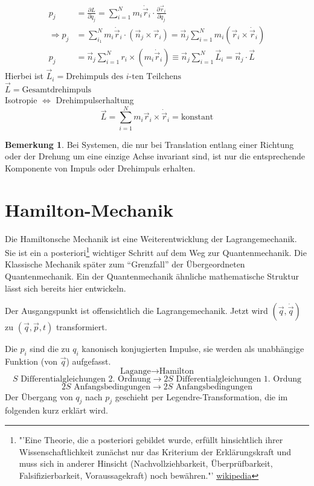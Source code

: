 \documentclass[oneside]{book}
\theoremstyle{definition}
\newtheorem*{bemerkung*}{Bemerkung}
\newcommand{\dotvec}[1]{\dot{\vec{#1}}}
\newcommand{\const}{\text{konstant}}
\begin{document}
\begin{align*}
	p_j &= \frac{\partial L}{\partial \dot q_j} = \sum\limits_{i=1}^Nm_i \dot {\vec r}_i \cdot \frac{\partial \vec r_i}{\partial q_j}\\
	\Rightarrow p_j &= \sum\limits_{i_1}^N m_i \dot {\vec r}_i \cdot (\vec n_j \times \vec r_i) = \vec n_j \sum\limits_{i=1}^N m_i (\vec r_i \times \dot {\vec r}_i)\\
	p_j &= \vec n_j \sum\limits_{i=1}^N r_i \times (m_i\dot{\vec r}_i) \equiv \vec n_j \sum\limits_{i=1}^N \vec L_i = \vec n_j \cdot \vec L
\end{align*}
Hierbei ist
$\vec L_i = \text{Drehimpuls des $i$-ten Teilchens}$\\
$\vec L = \text{Gesamtdrehimpuls}$\\
Isotropie  $\Leftrightarrow$ Drehimpulserhaltung
\[\vec L = \sum\limits_{i=1}^Nm_i \vec r_i \times \dotvec r_i = \const \]
\begin{bemerkung*}
	Bei Systemen, die nur bei Translation entlang einer Richtung oder der Drehung um eine einzige Achse invariant sind, ist nur die entsprechende Komponente von Impuls oder Drehimpuls erhalten.
\end{bemerkung*}

\section{Hamilton-Mechanik}
Die Hamiltonsche Mechanik ist eine Weiterentwicklung der Lagrangemechanik. Sie ist ein a posteriori\footnote{"'Eine Theorie, die a posteriori gebildet wurde, erfüllt hinsichtlich ihrer Wissenschaftlichkeit zunächst nur das Kriterium der Erklärungskraft und muss sich in anderer Hinsicht (Nachvollziehbarkeit, Überprüfbarkeit, Falsifizierbarkeit, Voraussagekraft) noch bewähren."' \href{https://de.wikipedia.org/wiki/A_posteriori}{wikipedia}} wichtiger Schritt auf dem Weg zur Quantenmechanik. Die Klassische Mechanik später zum "`Grenzfall"' der Übergeordneten Quantenmechanik. Ein der Quantenmechanik ähnliche mathematische Struktur lässt sich bereits hier entwickeln.

Der Ausgangspunkt ist offensichtlich die Lagrangemechanik. Jetzt wird $(\vec q, \dot {\vec q})$ zu $(\vec q, \vec p, t)$ transformiert.

Die $p_i$ sind die zu $q_i$ kanonisch konjugierten Impulse, sie werden als unabhängige Funktion (von $\vec q$) aufgefasst.
\[\text{Lagange}\to\text{Hamilton}\]
\[\text{$S$ Differentialgleichungen 2. Ordnung}\to\text{$2S$ Differentialgleichungen 1. Ordung}\]
\[\text{$2S$ Anfangsbedingungen}\to\text{$2S$ Anfangsbedingungen}\]
Der Übergang von $q_j$ nach $p_j$ geschieht per Legendre-Transformation, die im folgenden kurz erklärt wird.
\end{document}
